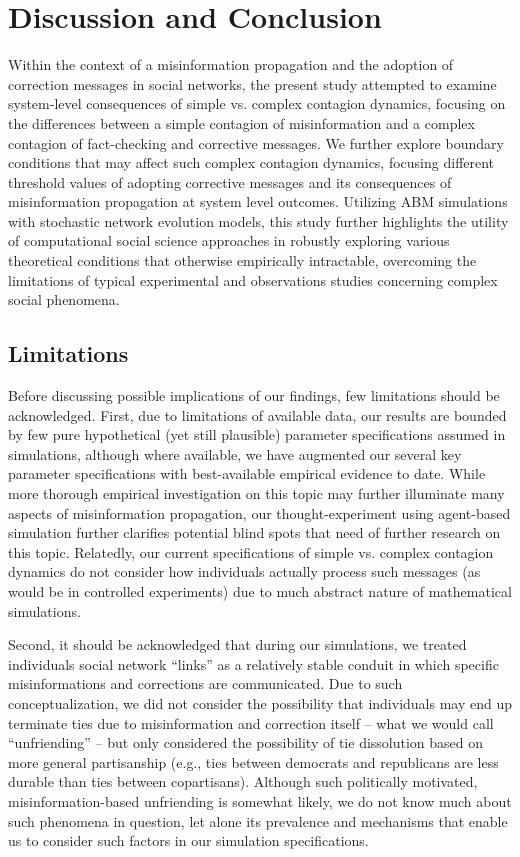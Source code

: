 \documentclass[man, 12pt, a4paper, nolmodern, noextraspace]{apa6}
\begin{document}
\section{Discussion and Conclusion}
  Within the context of a misinformation propagation and the adoption of correction messages in social networks, the present study attempted to examine system-level consequences of simple vs. complex contagion dynamics, focusing on the differences between a simple contagion of misinformation and a complex contagion of fact-checking and corrective messages. We further explore boundary conditions that may affect such complex contagion dynamics, focusing different threshold values of adopting corrective messages and its consequences of misinformation propagation at system level outcomes. Utilizing ABM simulations with stochastic network evolution models, this study further highlights the utility of computational social science approaches in robustly exploring various theoretical conditions that otherwise empirically intractable, overcoming the limitations of typical experimental and observations studies concerning complex social phenomena.
    
\subsection{Limitations}
  Before discussing possible implications of our findings, few limitations should be acknowledged. First, due to limitations of available data, our results are bounded by few pure hypothetical (yet still plausible) parameter specifications assumed in simulations, although where available, we have augmented our several key parameter specifications with best-available empirical evidence to date. While more thorough empirical investigation on this topic may further illuminate many aspects of misinformation propagation, our thought-experiment using agent-based simulation further clarifies potential blind spots that need of further research on this topic. Relatedly, our current specifications of simple vs. complex contagion dynamics do not consider how individuals actually process such messages (as would be in controlled experiments) due to much abstract nature of mathematical simulations. 
    
    Second, it should be acknowledged that during our simulations, we treated individuals social network ``links'' as a relatively stable conduit in which specific misinformations and corrections are communicated. Due to such conceptualization, we did not consider the possibility that individuals may end up terminate ties due to misinformation and correction itself -- what we would call ``unfriending'' \parencite{yang2017politics, noel2011unfriending} -- but only considered the possibility of tie dissolution based on more general partisanship (e.g., ties between democrats and republicans are less durable than ties between copartisans). Although such politically motivated, misinformation-based unfriending is somewhat likely, we do not know much about such phenomena in question, let alone its prevalence and mechanisms that enable us to consider such factors in our simulation specifications.
    
\end{document}
